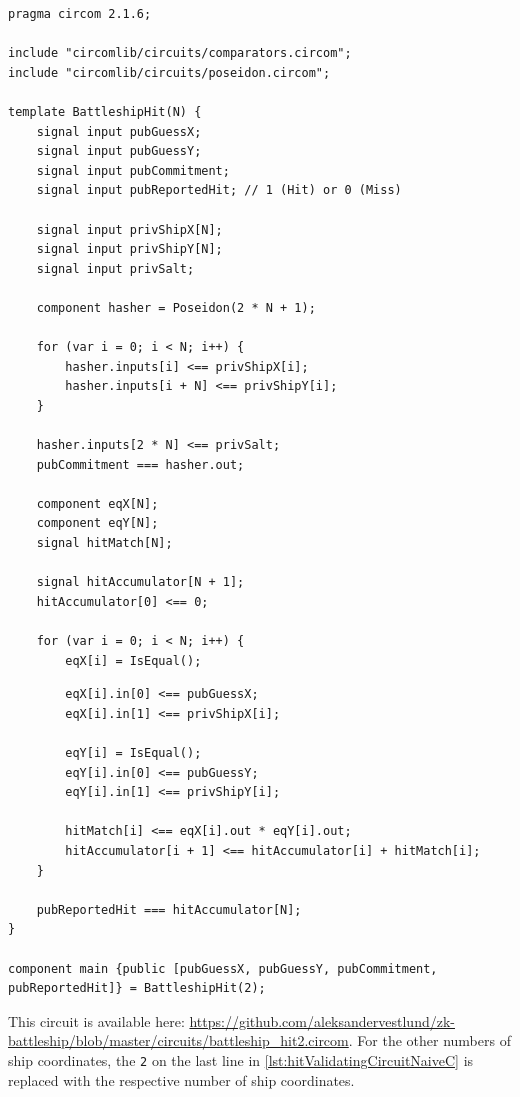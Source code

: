 \begin{listing}[H]
    \ContinuedFloat*
    \begin{verbatim}
pragma circom 2.1.6;

include "circomlib/circuits/comparators.circom";
include "circomlib/circuits/poseidon.circom";

template BattleshipHit(N) {
    signal input pubGuessX;
    signal input pubGuessY;
    signal input pubCommitment;
    signal input pubReportedHit; // 1 (Hit) or 0 (Miss)

    signal input privShipX[N];
    signal input privShipY[N];
    signal input privSalt;

    component hasher = Poseidon(2 * N + 1);

    for (var i = 0; i < N; i++) {
        hasher.inputs[i] <== privShipX[i];
        hasher.inputs[i + N] <== privShipY[i];
    }

    hasher.inputs[2 * N] <== privSalt;
    pubCommitment === hasher.out;
    
    component eqX[N];
    component eqY[N];
    signal hitMatch[N];
    
    signal hitAccumulator[N + 1];
    hitAccumulator[0] <== 0;

    for (var i = 0; i < N; i++) {
        eqX[i] = IsEqual();
    \end{verbatim}
    \caption{Na{\"\i}ve $\hit$ validating circuit for two coordinates.}
\end{listing}

\begin{listing}[H]
    \ContinuedFloat
    \begin{verbatim}
        eqX[i].in[0] <== pubGuessX;
        eqX[i].in[1] <== privShipX[i];

        eqY[i] = IsEqual();
        eqY[i].in[0] <== pubGuessY;
        eqY[i].in[1] <== privShipY[i];

        hitMatch[i] <== eqX[i].out * eqY[i].out;
        hitAccumulator[i + 1] <== hitAccumulator[i] + hitMatch[i];
    }
        
    pubReportedHit === hitAccumulator[N];
}

component main {public [pubGuessX, pubGuessY, pubCommitment, pubReportedHit]} = BattleshipHit(2);
    \end{verbatim}
    \caption{Na{\"\i}ve $\hit$ validating circuit for two coordinates (continued).}
    \label{lst:hitValidatingCircuitNaiveC}
\end{listing}

This circuit is available here: \url{https://github.com/aleksandervestlund/zk-battleship/blob/master/circuits/battleship_hit2.circom}. For the other numbers of ship coordinates, the \texttt{2} on the last line in \cref{lst:hitValidatingCircuitNaiveC} is replaced with the respective number of ship coordinates.

